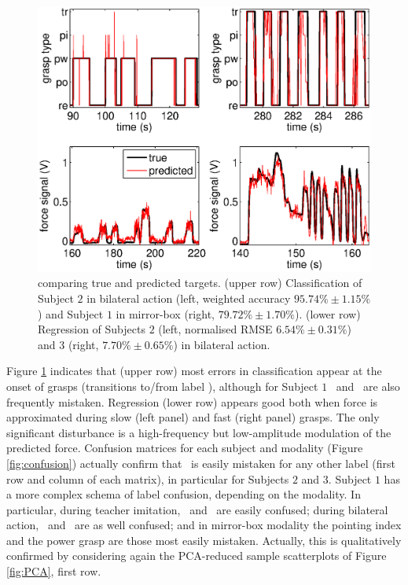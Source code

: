 \begin{figure}[!ht] \centering
  \includegraphics[width=\textwidth]{figs/figGuess}
  \caption{comparing true and predicted targets. (upper row) Classification
    of Subject $2$ in bilateral action (left, weighted accuracy $95.74\% \pm
    1.15\%$) and Subject $1$ in mirror-box (right, $79.72\% \pm 1.70\%$).
    (lower row) Regression of Subjects $2$ (left, normalised RMSE $6.54\% \pm
    0.31\%$) and $3$ (right, $7.70\% \pm 0.65\%$) in bilateral action.}
  \label{fig:guess}
\end{figure}

Figure \ref{fig:guess} indicates that (upper row) most errors in classification
appear at the onset of grasps (transitions to/from label \re), although for Subject $1$
\pw\ and \pi\ are also frequently mistaken. Regression (lower row) appears good
both when force is approximated during slow (left panel) and fast (right panel)
grasps. The only significant disturbance is a high-frequency but low-amplitude
modulation of the predicted force. Confusion matrices for each subject and
modality (Figure \ref{fig:confusion}) actually confirm that \re\ is easily mistaken
for any other label (first row and column of each matrix), in particular for
Subjects $2$ and $3$. Subject $1$ has a more complex schema of label confusion,
depending on the modality. In particular, during teacher imitation, \pi\ and
\tr\ are easily confused; during bilateral action, \pi\ and \pw\ are as well
confused; and in mirror-box modality the pointing index and the power grasp
are those most easily mistaken. Actually, this is qualitatively confirmed by
considering again the PCA-reduced sample scatterplots of Figure \ref{fig:PCA},
first row.

